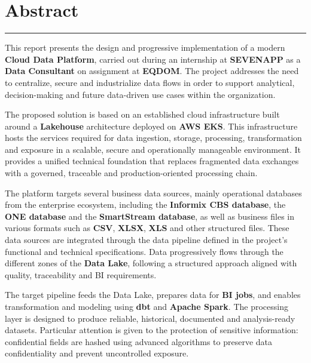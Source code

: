 \begingroup
\let\cleardoublepage\clearpage
\chapter*{Abstract}

\begin{center}
{\color{softline}\rule{0.42\textwidth}{0.7pt}}
\end{center}

\vspace{0.18cm}

\begingroup
\enlargethispage{2\baselineskip}
\small
\setlength{\parindent}{0pt}
\setlength{\parskip}{0.42em}
\linespread{1.0}\selectfont
This report presents the design and progressive implementation of a modern \textbf{Cloud Data Platform}, carried out during an internship at \textbf{SEVENAPP} as a \textbf{Data Consultant} on assignment at \textbf{EQDOM}. The project addresses the need to centralize, secure and industrialize data flows in order to support analytical, decision-making and future data-driven use cases within the organization.

The proposed solution is based on an established cloud infrastructure built around a \textbf{Lakehouse} architecture deployed on \textbf{AWS EKS}. This infrastructure hosts the services required for data ingestion, storage, processing, transformation and exposure in a scalable, secure and operationally manageable environment. It provides a unified technical foundation that replaces fragmented data exchanges with a governed, traceable and production-oriented processing chain.

The platform targets several business data sources, mainly operational databases from the enterprise ecosystem, including the \textbf{Informix CBS database}, the \textbf{ONE database} and the \textbf{SmartStream database}, as well as business files in various formats such as \textbf{CSV}, \textbf{XLSX}, \textbf{XLS} and other structured files. These data sources are integrated through the data pipeline defined in the project's functional and technical specifications. Data progressively flows through the different zones of the \textbf{Data Lake}, following a structured approach aligned with quality, traceability and BI requirements.

The target pipeline feeds the Data Lake, prepares data for \textbf{BI jobs}, and enables transformation and modeling using \textbf{dbt} and \textbf{Apache Spark}. The processing layer is designed to produce reliable, historical, documented and analysis-ready datasets. Particular attention is given to the protection of sensitive information: confidential fields are hashed using advanced algorithms to preserve data confidentiality and prevent uncontrolled exposure.

